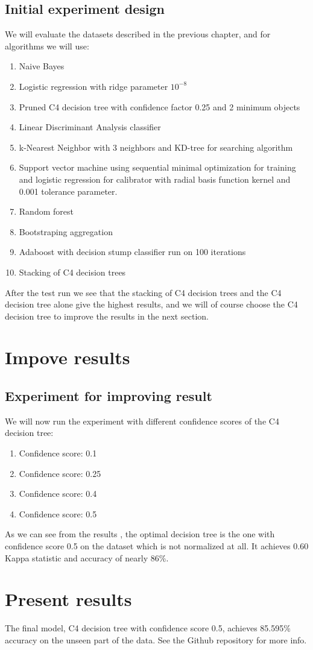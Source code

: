 \section{Initial experiment design}
We will evaluate the datasets described in the previous chapter, and for algorithms we will use:
\begin{enumerate}
    \item Naive Bayes
    \item Logistic regression with ridge parameter $10^{-8}$
    \item Pruned C4 decision tree with confidence factor 0.25 and 2 minimum objects
    \item Linear Discriminant Analysis classifier
    \item k-Nearest Neighbor with 3 neighbors and KD-tree for searching algorithm
    \item Support vector machine using sequential minimal optimization for training and logistic regression for calibrator with radial basis function kernel and 0.001 tolerance parameter.
    \item Random forest
    \item Bootstraping aggregation
    \item Adaboost with decision stump classifier run on 100 iterations
    \item Stacking of C4 decision trees
\end{enumerate}
After the test run we see \cite{repo} that the stacking of C4 decision trees and the C4 decision tree alone give the highest results, and we will of course choose the C4 decision tree to improve the results in the next section.

\chapter{Impove results}
\section{Experiment for improving result}
We will now run the experiment with different confidence scores of the C4 decision tree:
\begin{enumerate}
    \item Confidence score: 0.1
    \item Confidence score: 0.25
    \item Confidence score: 0.4
    \item Confidence score: 0.5
\end{enumerate}
As we can see from the results \cite{repo}, the optimal decision tree is the one with confidence score 0.5 on the dataset which is not normalized at all. It achieves 0.60 Kappa statistic and accuracy of nearly 86\%.

\chapter{Present results}
The final model, C4 decision tree with confidence score 0.5, achieves 85.595\% accuracy on the unseen part of the data. See the Github repository \cite{repo} for more info.